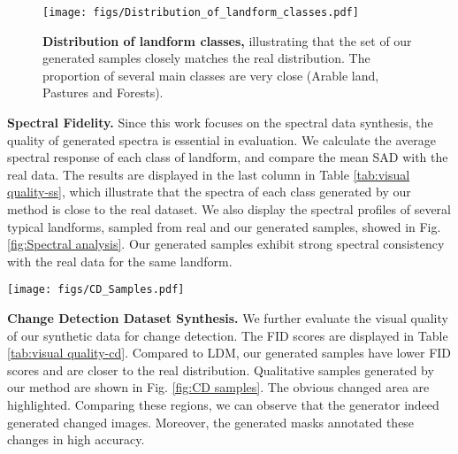 \begin{figure}[t]
    \texttt{[image: figs/Distribution\_of\_landform\_classes.pdf]}
    \vspace{-7mm}
    \caption{\textbf{Distribution of landform classes,} illustrating that the set of our generated samples closely matches the real distribution. The proportion of several main classes are very close (Arable land, Pastures and Forests).}
    \label{fig:Distribution of landform classes}
\end{figure}

\noindent
\textbf{Spectral Fidelity.} Since this work focuses on the spectral data synthesis, the quality of generated spectra is essential in evaluation. We calculate the average spectral response of each class of landform, and compare the mean SAD with the real data. The results are displayed in the last column in Table \ref{tab:visual quality-ss}, which illustrate that the spectra of each class generated by our method is close to the real dataset. We also display the spectral profiles of several typical landforms, sampled from real and our generated samples, showed in Fig. \ref{fig:Spectral analysis}. Our generated samples exhibit strong spectral consistency with the real data for the same landform.

\begin{figure*}[th]
    \centering
    \texttt{[image: figs/CD\_Samples.pdf]}
    \vspace{-4mm}
    \caption{\textbf{Generated samples-OSCD.} We visualize several samples generated by our method and highlight the changed regions. The masks can annotate these changes in high accuracy.}
    \label{fig:CD samples}
\end{figure*}

\noindent
\textbf{Change Detection Dataset Synthesis.}
We further evaluate the visual quality of our synthetic data for change detection. The FID scores are displayed in Table \ref{tab:visual quality-cd}. Compared to LDM, our generated samples have lower FID scores and are closer to the real distribution. Qualitative samples generated by our method are shown in Fig. \ref{fig:CD samples}. The obvious changed area are highlighted. Comparing these regions, we can observe that the generator indeed generated changed images. Moreover, the generated masks annotated these changes in high accuracy.

\begin{table}[t]
  \centering
  \vspace{-3mm}
  \caption{\textbf{Quantitative evaluation of synthetic dataset-OSCD.} Our method outperforms LDM in both image and mask generation.}
  \label{tab:visual quality-cd}
\end{table}

